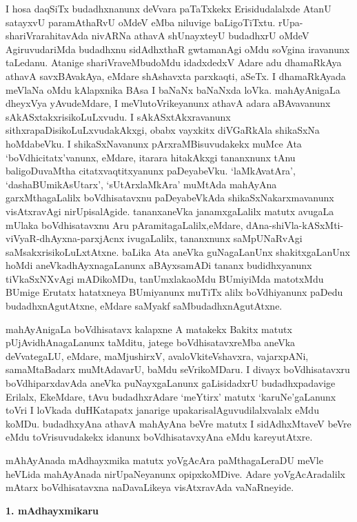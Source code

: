I hosa daqSiTx budadhxnanunx deVvara paTaTxkekx Erisidudalalxde AtanU satayxvU para\-mAthaRvU oMdeV eMba niluvige baLigoTiTxtu. rUpa-shariVrarahitavAda nivARNa athavA shUnayxteyU budadhxrU oMdeV AgiruvudariMda budadhxnu sidAdhxthaR gwtama\-nAgi oMdu soVgina iravanunx taLedanu. Atanige shariVraveMbudoMdu idadxdedxV Adare adu dhamaRkAya athavA savxBAvakAya, eMdare shAshavxta parxkaqti, aSeTx. I dhamaR\-kAyada meVlaNa oMdu kAlapxnika BAsa I baNaNx baNaNxda loVka. mahAyAnigaLa dheyxVya yAvudeMdare, I meVlutoVrikeyanunx athavA adara aBAvavanunx sAkASx\-takxrisikoLuLxvudu. I sAkASxtAkxravanunx sithxrapaDisikoLuLxvudakAkxgi, obabx vayxkitx diVGaRkAla shikaSxNa hoMdabeVku. I shikaSxNavanunx pArxraMBisuvudakekx muMce Ata `boVdhicitatx'vanunx, eMdare, itarara hitakAkxgi tananxnunx tAnu baligoDuvaMtha citatxvaqtitxyanunx paDeyabeVku. `laMkAvatAra', `dashaBUmikAsUtarx', `sUtArxlaMkAra' muMtAda mahAyAna garxMtha\-gaLalilx boVdhisatavxnu paDeyabeVkAda shikaSxNakarxmavanunx visAtxravAgi nirUpisalAgide. tananx\break aneVka janamxgaLalilx matutx avugaLa mUlaka boVdhisatavxnu Aru pAramitagaLalilx,\break eMdare, dAna-shiVla-kASxMti-viVyaR-dhAyxna-parxjAcnx ivugaLalilx, tananxnunx saMpUNaR\-vAgi saMsakxrisikoLuLxtAtxne. baLika Ata aneVka guNagaLanUnx shakitxgaLanUnx hoMdi aneVka\break dhAyxnagaLanunx aBAyxsamADi tananx budidhxyanunx tiVkaSxNXvAgi mADikoMDu, tanUmxlaka\break oMdu BUmiyiMda matotxMdu BUmige Erutatx hatatxneya BUmiyanunx muTiTx alilx boVdhiyanunx paDedu budadhxnAgutAtxne, eMdare saMyakf saMbudadhxnAgutAtxne.

mahAyAnigaLa boVdhisatavx kalapxne A matakekx Bakitx matutx pUjAvidhAnagaLanunx taMditu, jatege boVdhisatavxreMba aneVka deVvategaLU, eMdare, maMjushirxV, avaloVkiteVshavxra, vajarxpANi, samaMtaBadarx muMtAdavarU, baMdu seVrikoMDaru. I divayx boVdhisatavxru boVdhiparxdavAda aneVka puNayxgaLanunx gaLisidadxrU budadhxpadavige Erilalx, EkeMdare, tAvu budadhxrAdare `meYtirx' matutx `karuNe'gaLanunx toVri I loVkada duHKatapatx janarige upakarisalAguvudilalxvalalx eMdu koMDu. budadhxyAna athavA mahAyAna beVre matutx I sidAdhxMtaveV beVre eMdu toVrisuvudakekx idanunx boVdhisatavxyAna eMdu kareyutAtxre.

mAhAyAnada mAdhayxmika matutx yoVgAcAra paMthagaLeraDU meVle heVLida mahAyAnada nirUpaNeyanunx opipxkoMDive. Adare yoVgAcAradalilx mAtarx boVdhisatavxna naDavaLikeya visAtxravAda vaNaRneyide.

\medskip
\begin{center}
{\textbf{\Large 1. mAdhayxmikaru}}
\end{center}

